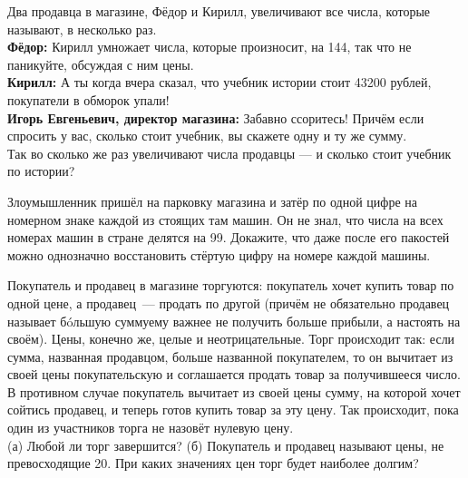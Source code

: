 ﻿
\begin{enumerate}
\itA Два продавца в магазине, Фёдор и Кирилл, увеличивают все числа, которые называют, в несколько раз. \smallskip\\
{\bfseries Фёдор:} Кирилл умножает числа, которые произносит, на 144, так что не паникуйте, обсуждая с ним цены. \smallskip\\
{\bfseries Кирилл:} А ты когда вчера сказал, что учебник истории стоит 43200 рублей, покупатели в обморок упали! \smallskip\\
{\bfseries Игорь Евгеньевич, директор магазина:} Забавно ссоритесь! Причём если спросить у вас, сколько стоит учебник, вы скажете одну и ту же сумму. \smallskip\\
Так во сколько же раз увеличивают числа продавцы — и сколько стоит учебник по истории?

\itB Злоумышленник пришёл на парковку магазина и затёр по одной цифре на номерном знаке каждой из стоящих там машин. Он не знал, что числа на всех номерах машин в стране делятся на 99. Докажите, что даже после его пакостей можно однозначно восстановить стёртую цифру на номере каждой машины.

\itC Покупатель и продавец в магазине торгуются: покупатель хочет купить товар по одной цене, а продавец~— продать по другой (причём не обязательно продавец называет б\'oльшую сумму\scolon ему важнее не получить больше прибыли, а настоять на своём). Цены, конечно же, целые и неотрицательные. Торг происходит так: если сумма, названная продавцом, больше названной покупателем, то он вычитает из своей цены покупательскую и соглашается продать товар за получившееся число. В противном случае покупатель вычитает из своей цены сумму, на которой хочет сойтись продавец, и теперь готов купить товар за эту цену. Так происходит, пока один из участников торга не назовёт нулевую цену. \smallskip\\
(а) Любой ли торг завершится? (б) Покупатель и продавец называют цены, не превосходящие 20. При каких значениях цен торг будет наиболее долгим?
\end{enumerate}
